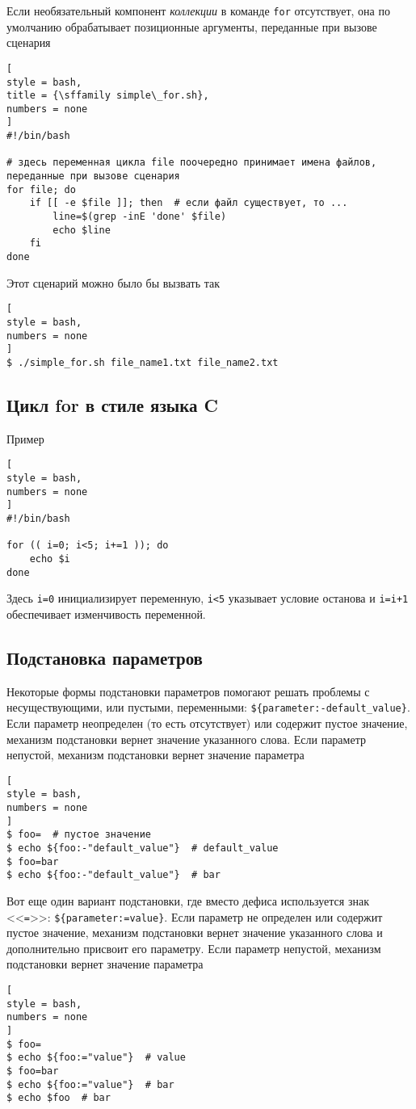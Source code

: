 \documentclass[%
	11pt,
	a4paper,
	utf8,
		]{article}
\begin{document}
Если необязательный компонент \emph{коллекции} в команде \texttt{for} отсутствует, она по умолчанию обрабатывает позиционные аргументы, переданные при вызове сценария
\begin{lstlisting}[
style = bash,
title = {\sffamily simple\_for.sh},
numbers = none
]
#!/bin/bash

# здесь переменная цикла file поочередно принимает имена файлов, переданные при вызове сценария
for file; do
    if [[ -e $file ]]; then  # если файл существует, то ...
        line=$(grep -inE 'done' $file)
        echo $line
    fi
done
\end{lstlisting}

Этот сценарий можно было бы вызвать так
\begin{lstlisting}[
style = bash,
numbers = none
]
$ ./simple_for.sh file_name1.txt file_name2.txt
\end{lstlisting}

\subsection{Цикл for в стиле языка C}

Пример
\begin{lstlisting}[
style = bash,
numbers = none
]
#!/bin/bash

for (( i=0; i<5; i+=1 )); do
    echo $i
done
\end{lstlisting}

Здесь \verb|i=0| инициализирует переменную, \verb|i<5| указывает условие останова и \verb|i=i+1| обеспечивает изменчивость переменной.

\subsection{Подстановка параметров}

Некоторые формы подстановки параметров помогают решать проблемы с несуществующими, или пустыми, переменными: \verb|${parameter:-default_value}|. Если параметр неопределен (то есть отсутствует) или содержит пустое значение, механизм подстановки вернет значение указанного слова. Если параметр непустой, механизм подстановки вернет значение параметра
\begin{lstlisting}[
style = bash,
numbers = none
]
$ foo=  # пустое значение
$ echo ${foo:-"default_value"}  # default_value
$ foo=bar
$ echo ${foo:-"default_value"}  # bar
\end{lstlisting}

Вот еще один вариант подстановки, где вместо дефиса используется знак <<\texttt{=}>>: \verb|${parameter:=value}|. Если параметр не определен или содержит пустое значение, механизм подстановки вернет значение указанного слова и дополнительно присвоит его параметру. Если параметр непустой, механизм подстановки вернет значение параметра
\begin{lstlisting}[
style = bash,
numbers = none
]
$ foo=
$ echo ${foo:="value"}  # value
$ foo=bar
$ echo ${foo:="value"}  # bar
$ echo $foo  # bar
\end{lstlisting}
\end{document}
